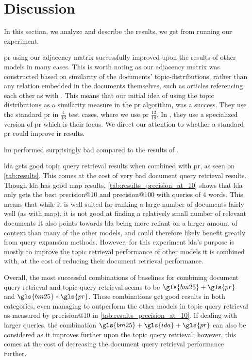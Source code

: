 \section{Discussion}\label{sec:discussion}
In this section, we analyze and describe the results, we get from running our experiment.

\gls{pr} using our adjacency-matrix successfully improved upon the results of other models in many cases.
This is worth noting as our adjacency matrix was constructed based on similarity of the documents' topic-distributions, rather than any relation embedded in the documents themselves, such as articles referencing each other as with \cite{yang2009topic}.
This means that our initial idea of using the topic distributions as a similarity measure in the \gls{pr} algorithm, was a success.
They use the standard \gls{pr} in $\frac{4}{13}$ test cases, where we use \gls{pr} $\frac{12}{18}$.
In \cite{yang2009topic}, they use a specialized version of \gls{pr} which is their focus.
We direct our attention to whether a standard \gls{pr} could improve \gls{ir} results.

\gls{lm} performed surprisingly bad compared to the results of \cite{yang2009topic}. 

\gls{lda} gets good topic query retrieval results when combined with \gls{pr}, as seen on \autoref{tab:results}.
This comes at the cost of very bad document query retrieval results.
Though \gls{lda} has good \gls{map} results, \autoref{tab:results_precision_at_10} shows that \gls{lda} only gets the best precision@10 and precision@100 with queries of 4 words.
This means that while it is well suited for ranking a large number of documents fairly well (as with \gls{map}), it is not good at finding a relatively small number of relevant documents
It also points towards \gls{lda} being more reliant on a larger amount of context than many of the other models, and could therefore likely benefit greatly from query expansion methods.
However, for this experiment \gls{lda}'s purpose is mostly to improve the topic retrieval performance of other models it is combined with, at the cost of reducing their document retrieval performance.

Overall, the most successful combinations of baselines for combining document query retrieval and topic query retrieval seems to be $\gls{bm25}+\gls{pr}$ and $\gls{bm25}*\gls{pr}$.
These combinations get good results in both categories, even managing to outperform the other models in topic query retrieval as measured by precision@10 in \autoref{tab:results_precision_at_10}.
If dealing with larger queries, the combination $\gls{bm25}+\gls{lda}+\gls{pr}$ can also be considered as it improves further upon the topic query retrieval; however, this comes at the cost of decreasing the document query retrieval performance further.

